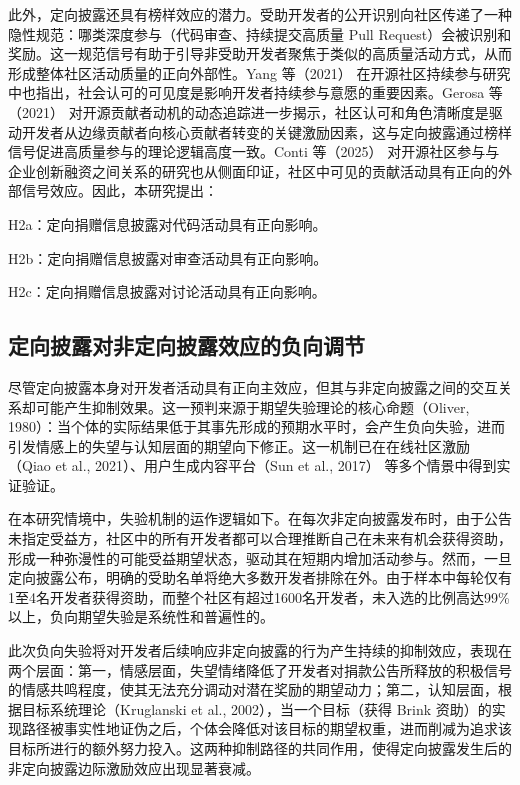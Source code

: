 \documentclass[
    type = master, %
    degree = professional,        %
    decl-page,  %
    twoside,                %
    fontset = fandol %
  ]{njuthesis}
\begin{document}
此外，定向披露还具有榜样效应的潜力。受助开发者的公开识别向社区传递了一种隐性规范：哪类深度参与（代码审查、持续提交高质量 Pull Request）会被识别和奖励。这一规范信号有助于引导非受助开发者聚焦于类似的高质量活动方式，从而形成整体社区活动质量的正向外部性。Yang 等（2021）\cite{yang2021differential} 在开源社区持续参与研究中也指出，社会认可的可见度是影响开发者持续参与意愿的重要因素。Gerosa 等（2021）\cite{gerosa2021shifting} 对开源贡献者动机的动态追踪进一步揭示，社区认可和角色清晰度是驱动开发者从边缘贡献者向核心贡献者转变的关键激励因素，这与定向披露通过榜样信号促进高质量参与的理论逻辑高度一致。Conti 等（2025）\cite{conti2025beefing} 对开源社区参与与企业创新融资之间关系的研究也从侧面印证，社区中可见的贡献活动具有正向的外部信号效应。因此，本研究提出：

H2a：定向捐赠信息披露对代码活动具有正向影响。

H2b：定向捐赠信息披露对审查活动具有正向影响。

H2c：定向捐赠信息披露对讨论活动具有正向影响。

\subsection{定向披露对非定向披露效应的负向调节}

尽管定向披露本身对开发者活动具有正向主效应，但其与非定向披露之间的交互关系却可能产生抑制效果。这一预判来源于期望失验理论的核心命题（Oliver, 1980）\cite{oliver1980cognitive}：当个体的实际结果低于其事先形成的预期水平时，会产生负向失验，进而引发情感上的失望与认知层面的期望向下修正。这一机制已在在线社区激励（Qiao et al., 2021）\cite{qiao2021mitigating}、用户生成内容平台（Sun et al., 2017）\cite{sun2017motivation} 等多个情景中得到实证验证。

在本研究情境中，失验机制的运作逻辑如下。在每次非定向披露发布时，由于公告未指定受益方，社区中的所有开发者都可以合理推断自己在未来有机会获得资助，形成一种弥漫性的可能受益期望状态，驱动其在短期内增加活动参与。然而，一旦定向披露公布，明确的受助名单将绝大多数开发者排除在外。由于样本中每轮仅有1至4名开发者获得资助，而整个社区有超过1600名开发者，未入选的比例高达99\%以上，负向期望失验是系统性和普遍性的。

此次负向失验将对开发者后续响应非定向披露的行为产生持续的抑制效应，表现在两个层面：第一，情感层面，失望情绪降低了开发者对捐款公告所释放的积极信号的情感共鸣程度，使其无法充分调动对潜在奖励的期望动力；第二，认知层面，根据目标系统理论（Kruglanski et al., 2002）\cite{kruglanski2002theory}，当一个目标（获得 Brink 资助）的实现路径被事实性地证伪之后，个体会降低对该目标的期望权重，进而削减为追求该目标所进行的额外努力投入。这两种抑制路径的共同作用，使得定向披露发生后的非定向披露边际激励效应出现显著衰减。
\end{document}
